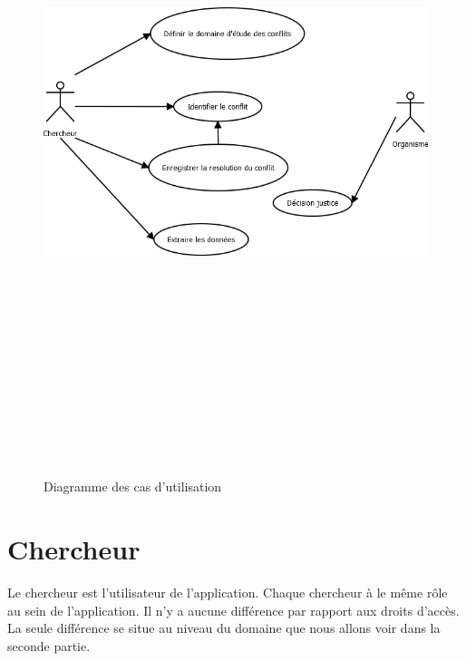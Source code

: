 \documentclass[12pt,a4paper]{article}
\begin{document}
\clearpage
\begin{figure}
\includegraphics[width=17cm,height=20cm,keepaspectratio]{Image/casUtilisation}%
\caption{Diagramme des cas d'utilisation}
\end{figure}

\vspace{1cm}
\section{Chercheur}
Le chercheur est l'utilisateur de l'application. Chaque chercheur à le même rôle au sein de l'application. Il n'y a aucune différence par rapport aux droits d'accès. La seule différence se situe au niveau du domaine que nous allons voir dans la seconde partie.
\end{document}
